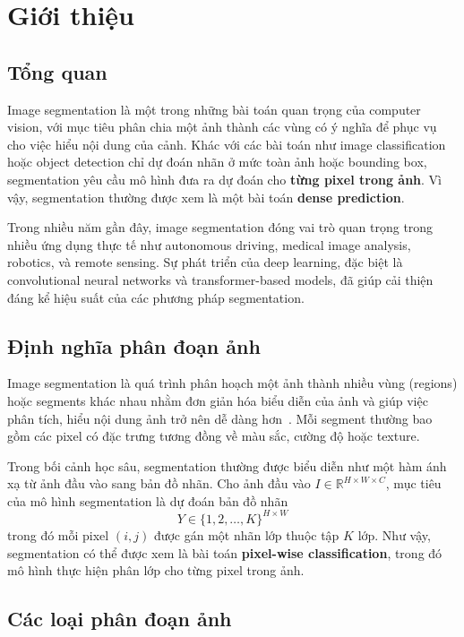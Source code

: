 \chapter{Giới thiệu}

\section{Tổng quan}

Image segmentation là một trong những bài toán quan trọng của computer vision, với mục tiêu phân chia một ảnh thành các vùng có ý nghĩa để phục vụ cho việc hiểu nội dung của cảnh. Khác với các bài toán như image classification hoặc object detection chỉ dự đoán nhãn ở mức toàn ảnh hoặc bounding box, segmentation yêu cầu mô hình đưa ra dự đoán cho \textbf{từng pixel trong ảnh}. Vì vậy, segmentation thường được xem là một bài toán \textbf{dense prediction}.

Trong nhiều năm gần đây, image segmentation đóng vai trò quan trọng trong nhiều ứng dụng thực tế như autonomous driving, medical image analysis, robotics, và remote sensing. Sự phát triển của deep learning, đặc biệt là convolutional neural networks và transformer-based models, đã giúp cải thiện đáng kể hiệu suất của các phương pháp segmentation.

\section{Định nghĩa phân đoạn ảnh}

Image segmentation là quá trình phân hoạch một ảnh thành nhiều vùng (regions) hoặc segments khác nhau nhằm đơn giản hóa biểu diễn của ảnh và giúp việc phân tích, hiểu nội dung ảnh trở nên dễ dàng hơn~\cite{lateef2019survey}. Mỗi segment thường bao gồm các pixel có đặc trưng tương đồng về màu sắc, cường độ hoặc texture.

Trong bối cảnh học sâu, segmentation thường được biểu diễn như một hàm ánh xạ từ ảnh đầu vào sang bản đồ nhãn. Cho ảnh đầu vào $I \in \mathbb{R}^{H \times W \times C}$, mục tiêu của mô hình segmentation là dự đoán bản đồ nhãn
\begin{equation}
Y \in \{1, 2, \ldots, K\}^{H \times W}
\end{equation}
trong đó mỗi pixel $(i, j)$ được gán một nhãn lớp thuộc tập $K$ lớp. Như vậy, segmentation có thể được xem là bài toán \textbf{pixel-wise classification}, trong đó mô hình thực hiện phân lớp cho từng pixel trong ảnh.

\section{Các loại phân đoạn ảnh}

